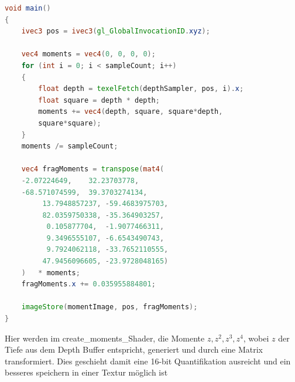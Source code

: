 \documentclass[runningheaders,a4paper]{llncs}
\begin{document}
\begin{lstlisting}[language=GLSL]
void main()
{
    ivec3 pos = ivec3(gl_GlobalInvocationID.xyz);

    vec4 moments = vec4(0, 0, 0, 0);
    for (int i = 0; i < sampleCount; i++)
    {
        float depth = texelFetch(depthSampler, pos, i).x;
        float square = depth * depth;
        moments += vec4(depth, square, square*depth, 
        square*square);
    }
    moments /= sampleCount;

	vec4 fragMoments = transpose(mat4(
	-2.07224649,	32.23703778,
	-68.571074599,	39.3703274134,
    	 13.7948857237,	-59.4683975703,
    	 82.0359750338,	-35.364903257,
    	  0.105877704,	-1.9077466311,
    	  9.3496555107,	-6.6543490743,
    	  9.7924062118,	-33.7652110555,
    	 47.9456096605,	-23.9728048165)
    )	* moments;
	fragMoments.x += 0.035955884801;

    imageStore(momentImage, pos, fragMoments);
}
\end{lstlisting}

Hier werden im create\_moments\_Shader, die Momente $z, z^2, z^3, z^4$, wobei
$z$ der Tiefe aus dem Depth Buffer entspricht,
generiert und durch eine Matrix transformiert.
Dies geschieht damit eine 16-bit Quantifikation ausreicht und ein besseres speichern in einer Textur
möglich ist
\end{document}
